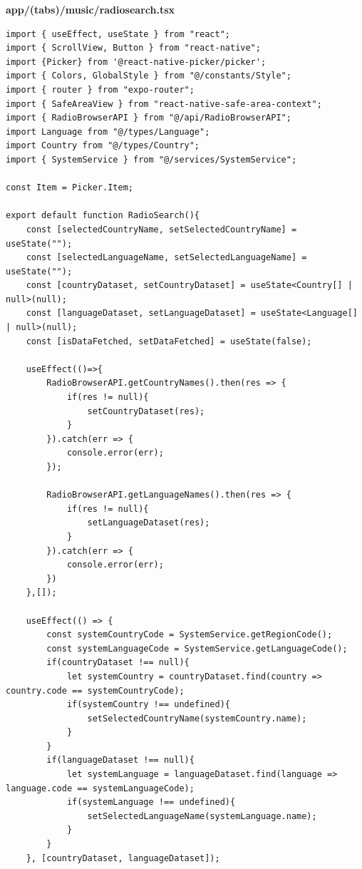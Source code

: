 \documentclass[11pt, twoside]{article}
\begin{document}
\textbf{app/(tabs)/music/radiosearch.tsx}
\begin{lstlisting}
import { useEffect, useState } from "react";
import { ScrollView, Button } from "react-native";
import {Picker} from '@react-native-picker/picker';
import { Colors, GlobalStyle } from "@/constants/Style";
import { router } from "expo-router";
import { SafeAreaView } from "react-native-safe-area-context";
import { RadioBrowserAPI } from "@/api/RadioBrowserAPI";
import Language from "@/types/Language";
import Country from "@/types/Country";
import { SystemService } from "@/services/SystemService";

const Item = Picker.Item;

export default function RadioSearch(){
    const [selectedCountryName, setSelectedCountryName] = useState("");
    const [selectedLanguageName, setSelectedLanguageName] = useState("");
    const [countryDataset, setCountryDataset] = useState<Country[] | null>(null);
    const [languageDataset, setLanguageDataset] = useState<Language[] | null>(null);
    const [isDataFetched, setDataFetched] = useState(false);

    useEffect(()=>{
        RadioBrowserAPI.getCountryNames().then(res => {
            if(res != null){
                setCountryDataset(res);
            }
        }).catch(err => {
            console.error(err);
        });

        RadioBrowserAPI.getLanguageNames().then(res => {
            if(res != null){
                setLanguageDataset(res);
            }
        }).catch(err => {
            console.error(err);
        })
    },[]);

    useEffect(() => {
        const systemCountryCode = SystemService.getRegionCode();
        const systemLanguageCode = SystemService.getLanguageCode();
        if(countryDataset !== null){
            let systemCountry = countryDataset.find(country => country.code == systemCountryCode);
            if(systemCountry !== undefined){
                setSelectedCountryName(systemCountry.name);
            }
        }
        if(languageDataset !== null){
            let systemLanguage = languageDataset.find(language => language.code == systemLanguageCode);
            if(systemLanguage !== undefined){
                setSelectedLanguageName(systemLanguage.name);
            }
        }
    }, [countryDataset, languageDataset]);


\end{lstlisting}
\end{document}

